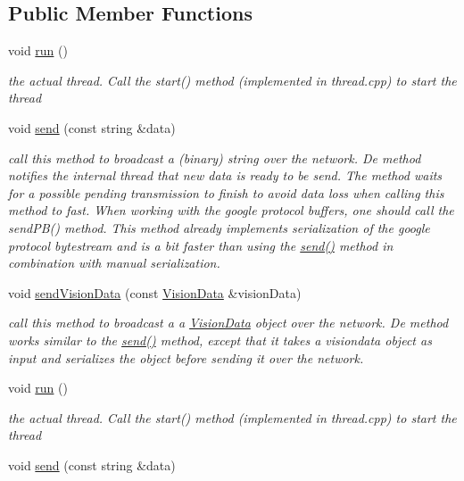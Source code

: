 \subsection*{Public Member Functions}
\begin{DoxyCompactItemize}
\item 
void \hyperlink{class_wifiserver_a90b8f75bcf303853841bb0ee6be96f02}{run} ()
\begin{DoxyCompactList}\small\item\em the actual thread. Call the start() method (implemented in thread.\-cpp) to start the thread \end{DoxyCompactList}\item 
\hypertarget{class_wifiserver_a059352fafb15b8213b5303f13151b4b8}{void \hyperlink{class_wifiserver_a059352fafb15b8213b5303f13151b4b8}{send} (const string \&data)}\label{class_wifiserver_a059352fafb15b8213b5303f13151b4b8}

\begin{DoxyCompactList}\small\item\em call this method to broadcast a (binary) string over the network. De method notifies the internal thread that new data is ready to be send. The method waits for a possible pending transmission to finish to avoid data loss when calling this method to fast. When working with the google protocol buffers, one should call the send\-P\-B() method. This method already implements serialization of the google protocol bytestream and is a bit faster than using the \hyperlink{class_wifiserver_a059352fafb15b8213b5303f13151b4b8}{send()} method in combination with manual serialization. \end{DoxyCompactList}\item 
\hypertarget{class_wifiserver_ab52dcb6abc601662889d3ce10d0aef99}{void \hyperlink{class_wifiserver_ab52dcb6abc601662889d3ce10d0aef99}{send\-Vision\-Data} (const \hyperlink{class_vision_data}{Vision\-Data} \&vision\-Data)}\label{class_wifiserver_ab52dcb6abc601662889d3ce10d0aef99}

\begin{DoxyCompactList}\small\item\em call this method to broadcast a a \hyperlink{class_vision_data}{Vision\-Data} object over the network. De method works similar to the \hyperlink{class_wifiserver_a059352fafb15b8213b5303f13151b4b8}{send()} method, except that it takes a visiondata object as input and serializes the object before sending it over the network. \end{DoxyCompactList}\item 
void \hyperlink{class_wifiserver_a90b8f75bcf303853841bb0ee6be96f02}{run} ()
\begin{DoxyCompactList}\small\item\em the actual thread. Call the start() method (implemented in thread.\-cpp) to start the thread \end{DoxyCompactList}\item 
\hypertarget{class_wifiserver_a059352fafb15b8213b5303f13151b4b8}{void \hyperlink{class_wifiserver_a059352fafb15b8213b5303f13151b4b8}{send} (const string \&data)}\label{class_wifiserver_a059352fafb15b8213b5303f13151b4b8}


\end{DoxyCompactItemize}
